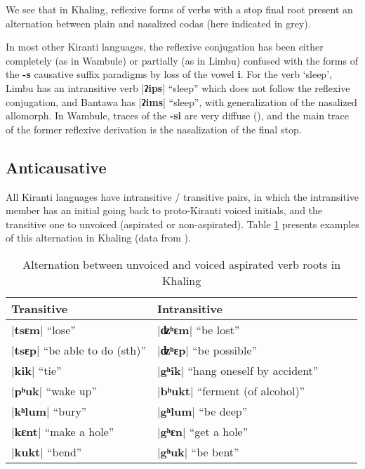 \documentclass[oldfontcommands,oneside,a4paper,11pt]{article}
\newcommand{\ipa}[1]{\textbf{{\phon\mbox{#1}}}} %
\newcommand{\dhatu}[2]{|\ipa{#1}| ``#2''}
\begin{document}
We see that in Khaling, reflexive forms of verbs with a stop final root present an alternation between plain and nasalized codas (here indicated in grey). 

In most other Kiranti languages, the reflexive conjugation has been either completely (as in Wambule) or partially (as in Limbu) confused with the forms of the \ipa{-s} causative suffix paradigms by loss of the vowel \ipa{i}. For the verb `sleep', Limbu has an intransitive verb \dhatu{ʔips}{sleep} which does not follow the reflexive conjugation, and Bantawa has \dhatu{ʔims}{sleep}, with generalization of the nasalized allomorph. In Wambule, traces of the \ipa{-si} are very diffuse (\citealt[305]{opgenort04wambule}), and the main trace of the former reflexive derivation is the nasalization of the final stop.
 

\subsection{Anticausative} \label{sec:anticaus}
All Kiranti languages have intransitive / transitive pairs, in which the intransitive member has an initial going back to proto-Kiranti voiced initials, and the transitive one to unvoiced (aspirated or non-aspirated). Table \ref{tab:anticaus} presents examples of this alternation in Khaling (data from \citealt{jacques15derivational.khaling}).

\begin{table}[H]
\caption{Alternation between unvoiced and voiced aspirated verb roots in Khaling} \centering \label{tab:anticaus}
\begin{tabular}{lllll}
\toprule
Transitive & Intransitive&  \\
\midrule
\dhatu{tsɛm}{lose} & \dhatu{ʣʰɛm}{be lost} \\
\dhatu{tsɛp}{be able to do (sth)} & \dhatu{ʣʰɛp}{be possible} \\
\dhatu{kik}{tie} & \dhatu{gʰik}{hang oneself by accident} \\
\dhatu{pʰuk}{wake up} & \dhatu{bʰukt}{ferment (of alcohol)} \\
\dhatu{kʰlum}{bury} & \dhatu{gʰlum}{be deep} \\
\midrule
\dhatu{kɛnt}{make a hole} & \dhatu{gʰɛn}{get a hole} \\
\dhatu{kukt}{bend} & \dhatu{gʰuk}{be bent}\\
\bottomrule
\end{tabular}
\end{table}
\end{document}
